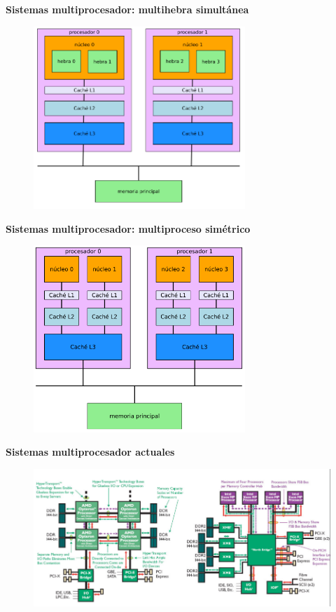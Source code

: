 \documentclass{article}
\begin{document}
\newpage

\textbf{Sistemas multiprocesador: multihebra simultánea}
\begin{figure}[h]
\centering
\includegraphics[scale=1,width=80mm]{multiprocesador-multihebra.png}
\end{figure}

\textbf{Sistemas multiprocesador: multiproceso simétrico}
\begin{figure}[h]
\centering
\includegraphics[scale=1,width=80mm]{multiprocesador-multihebra2.png}
\end{figure}

\newpage

\textbf{Sistemas multiprocesador actuales}
\begin{figure}[h]
\centering
\includegraphics[scale=1,width=140mm]{multiprocesador_actual.png}
\end{figure}
\end{document}
